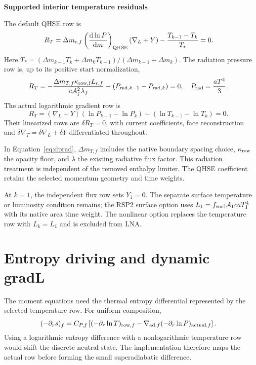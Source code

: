 \documentclass[11pt]{article}
\newcommand{\code}[1]{\texttt{\detokenize{#1}}}
\newcommand{\dd}{\mathrm d}
\newcommand{\area}{\mathcal A}
\newcommand{\dmf}{\Delta m_{c,f}}
\newcommand{\negds}{(-\partial_r s)}
\newenvironment{solved}[2]{%
 \begin{tcolorbox}[colback=#1!3!white,colframe=#1,boxrule=0.4pt,
 leftrule=2pt,arc=0pt,left=7pt,right=7pt,top=5pt,bottom=5pt,
 before skip=7pt,after skip=7pt]
 \noindent\textcolor{#1}{\textbf{#2}}\par
 \setlength{\abovedisplayskip}{5pt}\setlength{\belowdisplayskip}{5pt}
}{\end{tcolorbox}}
\numberwithin{equation}{section}
\begin{document}
\begin{solved}{Algebraic}{Supported interior temperature residuals}
The default QHSE row is
\begin{equation}
 R_T=\dmf\left(\frac{\dd\ln P}{\dd m}\right)_{\rm QHSE}
       (\nabla_L+Y)-\frac{T_{k-1}-T_k}{T_*}=0.
 \label{eq:qhs}
\end{equation}
Here $T_*=(\Delta m_{k-1}T_k+\Delta m_kT_{k-1})/
(\Delta m_{k-1}+\Delta m_k)$.
The radiation pressure row is, up to its positive start normalization,
\begin{equation}
 R_T=-\frac{\Delta m_{T,f}\kappa_{\rm row,f}L_{r,f}}
                   {c\area_f^2\lambda_f}
               -(P_{{\rm rad},k-1}-P_{{\rm rad},k})=0,
 \quad P_{\rm rad}=\frac{aT^4}{3}.
 \label{eq:dprad}
\end{equation}
The actual logarithmic gradient row is
\begin{equation}
 R_T=(\nabla_L+Y)(\ln P_{k-1}-\ln P_k)
                       -(\ln T_{k-1}-\ln T_k)=0 .
 \label{eq:actual}
\end{equation}
Their linearized rows are $\delta R_T=0$, with current coefficients,
face reconstruction and $\delta\nabla_T=\delta\nabla_L+\delta Y$
differentiated throughout.
\end{solved}
In Equation~\eqref{eq:dprad}, $\Delta m_{T,f}$ includes the native boundary
spacing choice, $\kappa_{\rm row}$ the opacity floor, and $\lambda$ the
existing radiative flux factor. This radiation treatment is independent of
the removed enthalpy limiter. The QHSE coefficient retains the selected
momentum geometry and time weights.

At $k=1$, the independent flux row sets $Y_1=0$.
The separate surface temperature or luminosity condition remains;
the RSP2 surface option uses $L_1=f_{\rm surf}\area_1caT_1^4$ with its
native area time weight. The nonlinear \code{constant_L} option replaces
the temperature row with $L_k=L_1$ and is excluded from LNA.

\clearpage
\section{Entropy driving and dynamic gradL}
The moment equations need the thermal entropy differential represented by
the selected temperature row. For uniform composition,
\begin{equation}
 \negds_f=C_{P,f}\left[
       (-\partial_r\ln T)_{{\rm row},f}
       -\nabla_{{\rm ad},f}(-\partial_r\ln P)_{{\rm actual},f}\right].
 \label{eq:entropy}
\end{equation}
Using a logarithmic entropy difference with a nonlogarithmic temperature
row would shift the discrete neutral state. The implementation therefore
maps the actual row before forming the small superadiabatic difference.
\end{document}
